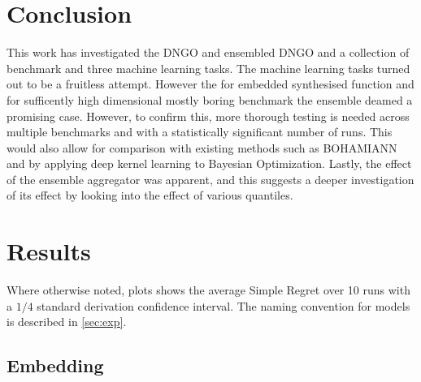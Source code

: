 \documentclass[conference,compsoc]{IEEEtran}
\theoremstyle{definition}
\begin{document}
\section{Conclusion}\label{sec:conclusion}
    
    This work has investigated the DNGO and ensembled DNGO and a collection of benchmark and three machine learning tasks.
    The machine learning tasks turned out to be a fruitless attempt.
    However the for embedded synthesised function and for sufficently high dimensional mostly boring benchmark the ensemble deamed a promising case.
    However, to confirm this, more thorough testing is needed across multiple benchmarks and with a statistically significant number of runs.
    This would also allow for comparison with existing methods such as BOHAMIANN \parencite{springenberg_bayesian_2016} and by applying deep kernel learning \parencite{wilson_deep_2016} to Bayesian Optimization.
    Lastly, the effect of the ensemble aggregator was apparent, and this suggests a deeper investigation of its effect by looking into the effect of various quantiles.
        
\printbibliography




\appendices
\onecolumn

\section{Results}
    Where otherwise noted, plots shows the average Simple Regret over 10 runs with a $1/4$ standard derivation confidence interval.
    The naming convention for models is described in \cref{sec:exp}.

    \subsection{Embedding}\label{sec:appembedding}
\end{document}

